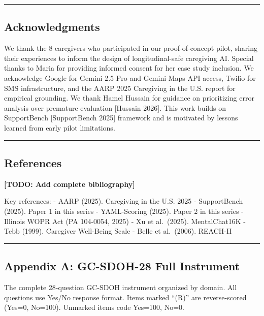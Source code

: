 \documentclass[
]{article}
\begin{document}
\begin{center}\rule{0.5\linewidth}{0.5pt}\end{center}

\subsection{Acknowledgments}\label{acknowledgments}

We thank the 8 caregivers who participated in our proof-of-concept
pilot, sharing their experiences to inform the design of
longitudinal-safe caregiving AI. Special thanks to Maria for providing
informed consent for her case study inclusion. We acknowledge Google for
Gemini 2.5 Pro and Gemini Maps API access, Twilio for SMS
infrastructure, and the AARP 2025 Caregiving in the U.S. report for
empirical grounding. We thank Hamel Hussain for guidance on prioritizing
error analysis over premature evaluation {[}Hussain 2026{]}. This work
builds on SupportBench {[}SupportBench 2025{]} framework and is
motivated by lessons learned from early pilot limitations.

\begin{center}\rule{0.5\linewidth}{0.5pt}\end{center}

\subsection{References}\label{references}

\textbf{{[}TODO: Add complete bibliography{]}}

Key references: - AARP (2025). Caregiving in the U.S. 2025 -
SupportBench (2025). Paper 1 in this series - YAML-Scoring (2025). Paper
2 in this series - Illinois WOPR Act (PA 104-0054, 2025) - Xu et
al.~(2025). MentalChat16K - Tebb (1999). Caregiver Well-Being Scale -
Belle et al.~(2006). REACH-II

\begin{center}\rule{0.5\linewidth}{0.5pt}\end{center}

\subsection{Appendix A: GC-SDOH-28 Full
Instrument}\label{appendix-a-gc-sdoh-28-full-instrument}

The complete 28-question GC-SDOH instrument organized by domain. All
questions use Yes/No response format. Items marked ``(R)'' are
reverse-scored (Yes=0, No=100). Unmarked items code Yes=100, No=0.
\end{document}
